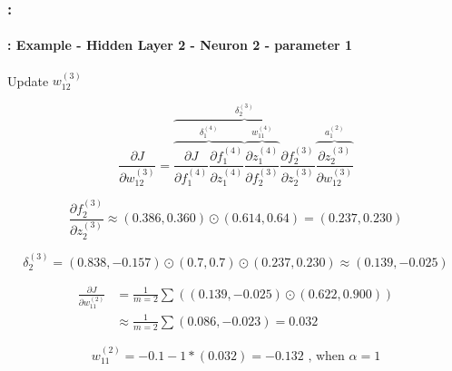 \documentclass[xcolor=table]{beamer}
\begin{document}
\begin{frame}
	\frametitle{\insertshortsubtitle: \insertsection}
	\framesubtitle{\insertsubsection: Example - Hidden Layer 2 - Neuron 2 - parameter 1}
	
	Update $w_{12}^{(3)}$
	
	\small
	
	\vskip-24pt
	\[
	\frac{\partial J}{\partial w_{12}^{(3)}} = 
	\overbrace{
		\overbrace{
			\frac{\partial J}{\partial f_{1}^{(4)}} 
			\frac{\partial f_{1}^{(4)}}{\partial z_{1}^{(4)}}
		}^{\delta_{1}^{(4)}} 
		\overbrace{
			\frac{\partial z_{1}^{(4)}}{\partial f_{2}^{(3)}}
		}^{w_{11}^{(4)}} 
		\frac{\partial f_{2}^{(3)}}{\partial z_{2}^{(3)}} 
	}^{\delta_{2}^{(3)}} 
	\overbrace{
		\frac{\partial z_{2}^{(3)}}{\partial w_{12}^{(3)}}
	}^{a_{1}^{(2)}}
	\]
	
	\vskip-6pt
	\[
	\frac{\partial f_{2}^{(3)}}{\partial z_{2}^{(3)}} \approx (0.386, 0.360) \odot (0.614, 0.64) = (0.237, 0.230)
	\]
	
	\vskip-6pt
	\[
	\delta_{2}^{(3)} = (0.838, -0.157) \odot (0.7, 0.7) \odot (0.237, 0.230) \approx (0.139, -0.025)
	\]
	
	\vskip-12pt
	\begin{align*}
		\frac{\partial J}{\partial w_{11}^{(2)}} & = \frac{1}{m=2} \sum ((0.139, -0.025) \odot (0.622, 0.900))    \\
		& \approx \frac{1}{m=2} \sum (0.086, -0.023) = 0.032
	\end{align*}
	
	
	\vskip-6pt
	\[
	w_{11}^{(2)} = - 0.1 - 1 * (0.032) = - 0.132 \text{ , when } \alpha = 1
	\]
	
\end{frame}
\end{document}
